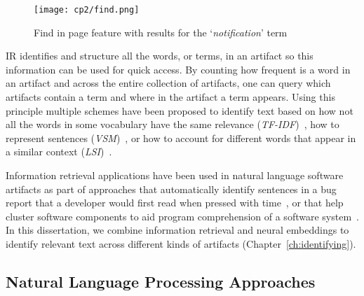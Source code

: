 
\medskip
\begin{figure}[h!]
    \centering
    \texttt{[image: cp2/find.png]}
    \caption{Find in page feature with results for the `\textit{notification}' term}
    \label{fig:find-in-page}
\end{figure}





\acs{IR} identifies and structure all the words, or terms, 
in an artifact so this information can be used for quick access. 
By counting how frequent is a word in 
an artifact and across the entire collection of artifacts, 
one can query which artifacts contain a term and where in the artifact a term appears. 
Using this principle multiple schemes have been proposed 
to identify text based on 
how not all the words in some vocabulary have the same relevance (\textit{TF-IDF})~\cite{luhn1957tf, jones2004idf}, 
how to  represent sentences (\textit{VSM})~\cite{salton1975vector}, 
or how to account for different words that appear in a similar context (\textit{LSI})~\cite{dumais1994latent}.





Information retrieval applications have been used in natural language software artifacts 
as part of approaches that
automatically identify sentences in a bug report that a developer would first read when pressed with time~\cite{Lotufo2012},
or that help cluster software components to aid program comprehension of a software system~\cite{Marcus2003}.
In this dissertation, we combine information retrieval and neural embeddings 
to identify relevant text across different kinds of artifacts (Chapter~\ref{ch:identifying}).



\subsection{Natural Language Processing Approaches}
\label{cp2:nlp}


